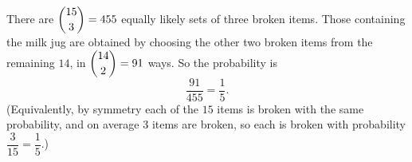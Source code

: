 There are $\dbinom{15}{3}=455$ equally likely sets of three broken items. Those containing the milk jug are obtained by choosing the other two broken items from the remaining $14$, in $\dbinom{14}{2}=91$ ways. So the probability is
\[\dfrac{91}{455}=\boxed{\dfrac15}.\]
(Equivalently, by symmetry each of the $15$ items is broken with the same probability, and on average $3$ items are broken, so each is broken with probability $\dfrac{3}{15}=\dfrac15$.)

